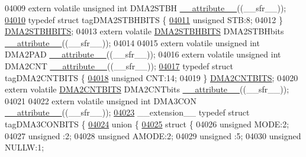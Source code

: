 \begin{DoxyCode}
04009 \textcolor{keyword}{extern} \textcolor{keyword}{volatile} \textcolor{keywordtype}{unsigned} \textcolor{keywordtype}{int}  DMA2STBH \hyperlink{a00009_a493c46f03454991ccc5aa7a6e1dfb2a7}{\_\_attribute\_\_}((\_\_sfr\_\_));
\hypertarget{a00009_source_l04010}{}\hyperlink{a00008}{04010} \textcolor{keyword}{typedef} \textcolor{keyword}{struct }tagDMA2STBHBITS \{
\hypertarget{a00009_source_l04011}{}\hyperlink{a00008_a9bd043a4db27e09b5035a563a8758fe7}{04011}   \textcolor{keywordtype}{unsigned} STB:8;
04012 \} \hyperlink{a00008_df/d15/a00416}{DMA2STBHBITS};
04013 \textcolor{keyword}{extern} \textcolor{keyword}{volatile} \hyperlink{a00008_df/d15/a00416}{DMA2STBHBITS} DMA2STBHbits \hyperlink{a00009_a493c46f03454991ccc5aa7a6e1dfb2a7}{\_\_attribute\_\_}((\_\_sfr\_\_));
04014 
04015 \textcolor{keyword}{extern} \textcolor{keyword}{volatile} \textcolor{keywordtype}{unsigned} \textcolor{keywordtype}{int}  DMA2PAD \hyperlink{a00009_a493c46f03454991ccc5aa7a6e1dfb2a7}{\_\_attribute\_\_}((\_\_sfr\_\_));
04016 \textcolor{keyword}{extern} \textcolor{keyword}{volatile} \textcolor{keywordtype}{unsigned} \textcolor{keywordtype}{int}  DMA2CNT \hyperlink{a00009_a493c46f03454991ccc5aa7a6e1dfb2a7}{\_\_attribute\_\_}((\_\_sfr\_\_));
\hypertarget{a00009_source_l04017}{}\hyperlink{a00008}{04017} \textcolor{keyword}{typedef} \textcolor{keyword}{struct }tagDMA2CNTBITS \{
\hypertarget{a00009_source_l04018}{}\hyperlink{a00008_a30be39d82c244f19fd98dd74227487f6}{04018}   \textcolor{keywordtype}{unsigned} CNT:14;
04019 \} \hyperlink{a00008_dd/dea/a00408}{DMA2CNTBITS};
04020 \textcolor{keyword}{extern} \textcolor{keyword}{volatile} \hyperlink{a00008_dd/dea/a00408}{DMA2CNTBITS} DMA2CNTbits \hyperlink{a00009_a493c46f03454991ccc5aa7a6e1dfb2a7}{\_\_attribute\_\_}((\_\_sfr\_\_));
04021 
04022 \textcolor{keyword}{extern} \textcolor{keyword}{volatile} \textcolor{keywordtype}{unsigned} \textcolor{keywordtype}{int}  DMA3CON \hyperlink{a00009_a493c46f03454991ccc5aa7a6e1dfb2a7}{\_\_attribute\_\_}((\_\_sfr\_\_));
\hypertarget{a00009_source_l04023}{}\hyperlink{a00008}{04023} \_\_extension\_\_ \textcolor{keyword}{typedef} \textcolor{keyword}{struct }tagDMA3CONBITS \{
\hypertarget{a00009_source_l04024}{}\hyperlink{a00009}{04024}   \textcolor{keyword}{union }\{
\hypertarget{a00009_source_l04025}{}\hyperlink{a00009}{04025}     \textcolor{keyword}{struct }\{
04026       \textcolor{keywordtype}{unsigned} MODE:2;
04027       \textcolor{keywordtype}{unsigned} :2;
04028       \textcolor{keywordtype}{unsigned} AMODE:2;
04029       \textcolor{keywordtype}{unsigned} :5;
04030       \textcolor{keywordtype}{unsigned} NULLW:1;

\end{DoxyCode}
